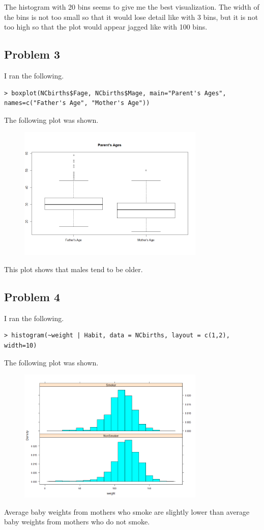 \documentclass[12pt]{article}
\begin{document}
The histogram with 20 bins seems to give me the best visualization. The width of the bins is not too small so that it would lose detail
like with 3 bins, but it is not too high so that the plot would appear jagged like with 100 bins.

\subsection*{Problem 3}

I ran the following.
\tiny
\begin{verbatim}
> boxplot(NCbirths$Fage, NCbirths$Mage, main="Parent's Ages", names=c("Father's Age", "Mother's Age"))
\end{verbatim}
\normalsize
The following plot was shown.
\begin{figure}[H]
    \begin{center}
        \includegraphics[width=3.5in]{section3problem3.png}
    \end{center}
\end{figure}
This plot shows that males tend to be older.

\subsection*{Problem 4}

I ran the following.
\scriptsize
\begin{verbatim}
> histogram(~weight | Habit, data = NCbirths, layout = c(1,2), width=10)
\end{verbatim}
\normalsize
The following plot was shown.
\begin{figure}[H]
    \begin{center}
        \includegraphics[width=3.5in]{section3problem4.png}
    \end{center}
\end{figure}
Average baby weights from mothers who smoke are slightly lower than average baby weights from mothers who do not smoke.
\end{document}
